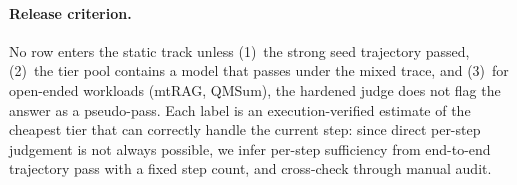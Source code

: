 \paragraph{Release criterion.}
No row enters the static track unless (1)~the strong seed trajectory passed,
(2)~the tier pool contains a model that passes under the mixed trace, and
(3)~for open-ended workloads (mtRAG, QMSum), the hardened judge does not flag
the answer as a pseudo-pass. Each label is
an execution-verified estimate of the cheapest tier that can correctly handle
the current step: since direct per-step judgement is not always possible, we
infer per-step sufficiency from end-to-end trajectory pass with a fixed step
count, and cross-check through manual audit.

